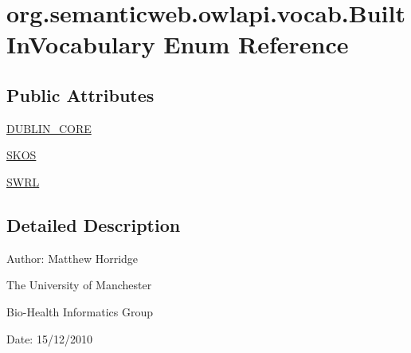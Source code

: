 \hypertarget{enumorg_1_1semanticweb_1_1owlapi_1_1vocab_1_1_built_in_vocabulary}{\section{org.\-semanticweb.\-owlapi.\-vocab.\-Built\-In\-Vocabulary Enum Reference}
\label{enumorg_1_1semanticweb_1_1owlapi_1_1vocab_1_1_built_in_vocabulary}
}
\subsection*{Public Attributes}
\begin{DoxyCompactItemize}
\item 
\hyperlink{enumorg_1_1semanticweb_1_1owlapi_1_1vocab_1_1_built_in_vocabulary_a59c8156f744b057885d6bc7dec488220}{D\-U\-B\-L\-I\-N\-\_\-\-C\-O\-R\-E}
\item 
\hyperlink{enumorg_1_1semanticweb_1_1owlapi_1_1vocab_1_1_built_in_vocabulary_a662cb60c5cb7ce1b88b42f318b2f8699}{S\-K\-O\-S}
\item 
\hyperlink{enumorg_1_1semanticweb_1_1owlapi_1_1vocab_1_1_built_in_vocabulary_a32b6a4dd0aefc99cabcc8a06996d2756}{S\-W\-R\-L}
\end{DoxyCompactItemize}


\subsection{Detailed Description}
Author\-: Matthew Horridge\par
 The University of Manchester\par
 Bio-\/\-Health Informatics Group\par
 Date\-: 15/12/2010 

